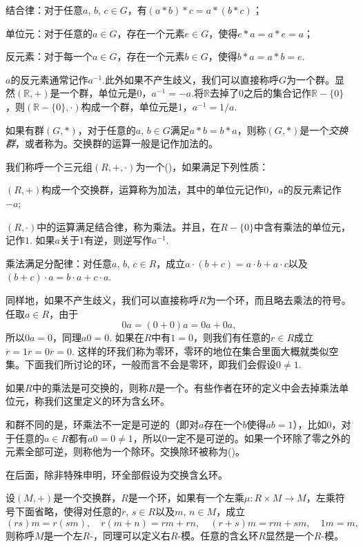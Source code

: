 结合律：对于任意$a$, $b$, $c\in G$，有$(a*b)*c=a*(b*c)$；

单位元：对于任意的$a\in G$，存在一个元素$e\in G$，使得$e*a=a*e=a$；

反元素：对于每一个$a\in G$，存在一个元素$b\in G$，使得$b*a=a*b=e$.

$a$的反元素通常记作$a^{-1}$.此外如果不产生歧义，我们可以直接称呼$G$为一个群。显然$(\mathbb{R},+)$是一个群，单位元是0，$a^{-1}=-a$.将$\mathbb{R}$去掉了$0$之后的集合记作$\mathbb{R}-\{0\}$，则$(\mathbb{R}-\{0\},\cdot)$构成一个群，单位元是$1$，$a^{-1}=1/a$.

如果有群$(G,*)$，对于任意的$a$, $b\in G$满足$a*b=b*a$，则称$(G,*)$是一个\textit{交换群}，或者称为。交换群的运算一般是记作加法的。

\para 我们称呼一个三元组$(R,+,\cdot)$为一个()，如果满足下列性质：

 $(R,+)$构成一个交换群，运算称为加法，其中的单位元记作$0$，$a$的反元素记作$-a$;

 $(R,\cdot)$中的运算满足结合律，称为乘法。并且，在$R-\{0\}$中含有乘法的单位元，记作$1$. 如果$a$关于$1$有逆，则逆写作$a^{-1}$.

 乘法满足分配律：对任意$a$, $b$, $c \in R$，成立$a\cdot(b+c)=a\cdot b+a\cdot c$以及$(b+c)\cdot a=b\cdot a+c\cdot a$.

同样地，如果不产生歧义，我们可以直接称呼$R$为一个环，而且略去乘法的符号。任取$a\in R$，由于
\[
	0a=(0+0)a=0a+0a,
\]
所以$0a=0$，同理$a0=0$. 如果在$R$中有$1=0$，则我们有任意的$r\in R$成立$r=1r=0r=0$. 这样的环我们称为零环，零环的地位在集合里面大概就类似空集。下面我们所讨论的环，一般而言不会是零环，即我们会假设$0\neq 1$.

如果$R$中的乘法是可交换的，则称$R$是一个。有些作者在环的定义中会去掉乘法单位元，称我们这里定义的环为含幺环。

和群不同的是，环乘法不一定是可逆的（即对$a$存在一个$b$使得$ab=1$），比如$0$，对于任意的$a\in R$都有$a0=0\neq 1$，所以$0$一定不是可逆的。如果一个环除了零之外的元素全部可逆，则称他为一个除环。交换除环被称为()。

在后面，除非特殊申明，环全部假设为交换含幺环。

\para 设$(M,+)$是一个交换群，$R$是一个环，如果有一个左乘$\mu:R\times M\to M$，左乘符号下面省略，使得对任意的$r$, $s\in R$以及$m$, $n\in M$，成立
\[
	(rs)m=r(sm),\quad r(m+n)=rm+rn,\quad (r+s)m=rm+sm,\quad 1m=m,
\]
则称呼$M$是一个左$R$-，同理可以定义右$R$-模。任意的含幺环$R$显然是一个$R$-模。

